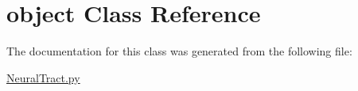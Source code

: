 \hypertarget{classobject}{}\section{object Class Reference}
\label{classobject}


The documentation for this class was generated from the following file\+:\begin{DoxyCompactItemize}
\item 
\hyperlink{_neural_tract_8py}{Neural\+Tract.\+py}\end{DoxyCompactItemize}
